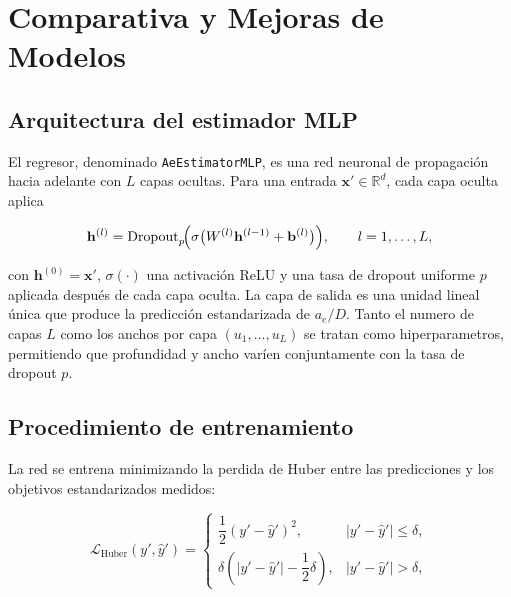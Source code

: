 \documentclass[12pt, letterpaper]{article}
\begin{document}
\section{Comparativa y Mejoras de Modelos}
\label{sec:modelos}

\subsection{Arquitectura del estimador MLP}

El regresor, denominado \texttt{AeEstimatorMLP}, es una red neuronal de propagación hacia adelante con $L$ capas ocultas. Para una entrada $\mathbf{x}' \in \mathbb{R}^d$, cada capa oculta aplica

\begin{equation}
  \mathbf{h}^{(l)} = \text{Dropout}_p\!\Bigl(\sigma\bigl(W^{(l)} \mathbf{h}^{(l-1)} + \mathbf{b}^{(l)}\bigr)\Bigr), \qquad l = 1,\dots,L,
  \label{eq:mlp}
\end{equation}

con $\mathbf{h}^{(0)} = \mathbf{x}'$, $\sigma(\cdot)$ una activación ReLU y una tasa de dropout uniforme $p$ aplicada después de cada capa oculta. La capa de salida es una unidad lineal única que produce la predicción estandarizada de $a_e/D$. Tanto el numero de capas $L$ como los anchos por capa $(u_1,\dots,u_L)$ se tratan como hiperparametros, permitiendo que profundidad y ancho varíen conjuntamente con la tasa de dropout $p$.

\subsection{Procedimiento de entrenamiento}

La red se entrena minimizando la perdida de Huber entre las predicciones y los objetivos estandarizados medidos:

\begin{equation}
  \mathcal{L}_{\text{Huber}}(y', \hat{y}') =
  \begin{cases}
    \dfrac{1}{2}(y' - \hat{y}')^2, & |y' - \hat{y}'| \le \delta, \\[6pt]
    \delta\!\left(|y' - \hat{y}'| - \dfrac{1}{2}\delta\right), & |y' - \hat{y}'| > \delta,
  \end{cases}
  \label{eq:huber}
\end{equation}
\end{document}
